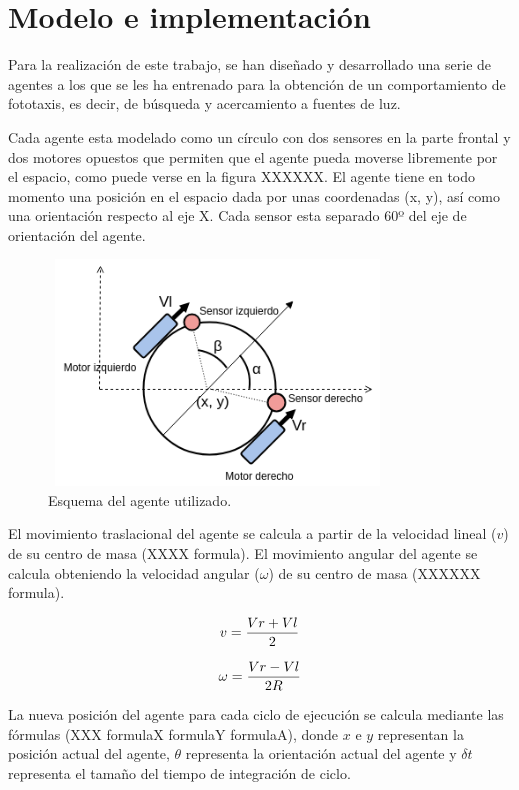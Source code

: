 \chapter{Modelo e implementación}
Para la realización de este trabajo, se han diseñado y desarrollado una serie de agentes a los que se les ha entrenado para la obtención de un comportamiento de fototaxis, es decir, de
búsqueda y acercamiento a fuentes de luz.

Cada agente esta modelado como un círculo con dos sensores en la parte frontal y dos motores opuestos que permiten que el agente pueda moverse libremente por el espacio, como puede verse
en la figura XXXXXX. El agente tiene en todo momento una posición en el espacio dada por unas coordenadas (x, y), así como una orientación respecto al eje X. Cada sensor esta separado
60º del eje de orientación del agente.

\begin{figure}[!h]
	\centering
	\includegraphics[width=0.8\textwidth,height=6cm]{Imagenes/Agent}
	\caption{Esquema del agente utilizado.}
	\label{fig:figuraMyAgent}
\end{figure}

El movimiento traslacional del agente se calcula a partir de la velocidad lineal ($v$) de su centro de masa (XXXX formula). El movimiento angular del agente se calcula obteniendo
la velocidad angular ($\omega$) de su centro de masa (XXXXXX formula).

\begin{equation} \label{eq:VFormula}
 \centering
 v = \frac{Vr + Vl}{2}
\end{equation}

\begin{equation} \label{eq:WFormula}
 \centering
 \omega = \frac{Vr - Vl}{2R}
\end{equation}

La nueva posición del agente para cada ciclo de ejecución se calcula mediante las fórmulas (XXX formulaX formulaY formulaA), donde $x$ e $y$ representan la posición actual del agente,
$\theta$ representa la orientación actual del agente y $\delta t$ representa el tamaño del tiempo de integración de ciclo.

